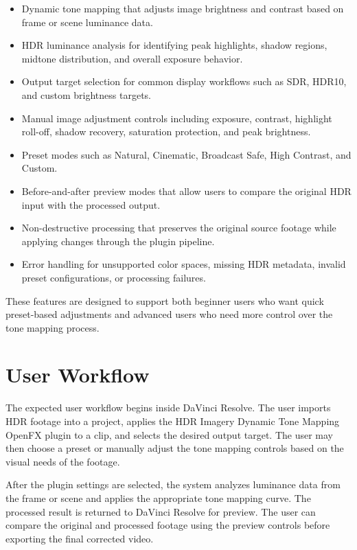\documentclass[11pt]{article}
\begin{document}
\begin{itemize}
    \item Dynamic tone mapping that adjusts image brightness and contrast based on frame or scene luminance data.
    \item HDR luminance analysis for identifying peak highlights, shadow regions, midtone distribution, and overall exposure behavior.
    \item Output target selection for common display workflows such as SDR, HDR10, and custom brightness targets.
    \item Manual image adjustment controls including exposure, contrast, highlight roll-off, shadow recovery, saturation protection, and peak brightness.
    \item Preset modes such as Natural, Cinematic, Broadcast Safe, High Contrast, and Custom.
    \item Before-and-after preview modes that allow users to compare the original HDR input with the processed output.
    \item Non-destructive processing that preserves the original source footage while applying changes through the plugin pipeline.
    \item Error handling for unsupported color spaces, missing HDR metadata, invalid preset configurations, or processing failures.
\end{itemize}

These features are designed to support both beginner users who want quick preset-based adjustments and advanced users who need more control over the tone mapping process.


\section{User Workflow}

The expected user workflow begins inside DaVinci Resolve. The user imports HDR footage into a project, applies the HDR Imagery Dynamic Tone Mapping OpenFX plugin to a clip, and selects the desired output target. The user may then choose a preset or manually adjust the tone mapping controls based on the visual needs of the footage.

After the plugin settings are selected, the system analyzes luminance data from the frame or scene and applies the appropriate tone mapping curve. The processed result is returned to DaVinci Resolve for preview. The user can compare the original and processed footage using the preview controls before exporting the final corrected video.
\end{document}
